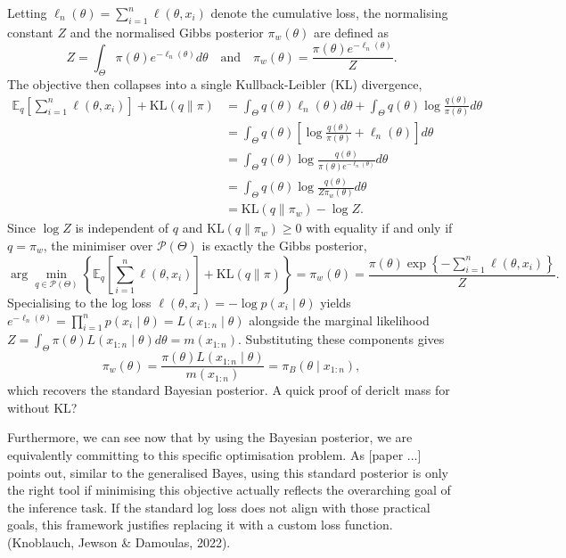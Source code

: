 \documentclass[11pt,a4paper]{article}
\newcommand{\add}[1]{{\color{red}#1}}
\begin{document}
Letting $\ell_n(\theta) = \sum_{i=1}^{n}\ell(\theta,x_i)$ denote the cumulative loss, the normalising constant $Z$ and the normalised Gibbs posterior $\pi_w(\theta)$ are defined as
$$Z = \int_{\Theta} \pi(\theta)e^{-\ell_n(\theta)}d\theta \quad \text{and} \quad \pi_w(\theta) = \frac{\pi(\theta)e^{-\ell_n(\theta)}}{Z}.$$
The objective then collapses into a single Kullback-Leibler (KL) divergence,
$$
    \begin{aligned}
        \mathbb{E}_{q}\left[\sum_{i=1}^{n}\ell(\theta,x_i)\right] + \mathrm{KL}(q \| \pi)
         & = \int_{\Theta} q(\theta)\ell_n(\theta)d\theta + \int_{\Theta} q(\theta)\log\frac{q(\theta)}{\pi(\theta)}d\theta \\
         & = \int_{\Theta} q(\theta)\left[\log\frac{q(\theta)}{\pi(\theta)} + \ell_n(\theta)\right]d\theta                  \\
         & = \int_{\Theta} q(\theta)\log\frac{q(\theta)}{\pi(\theta)e^{-\ell_n(\theta)}}d\theta                             \\ &= \int_{\Theta} q(\theta)\log\frac{q(\theta)}{Z\pi_w(\theta)}d\theta \\ &= \mathrm{KL}(q \| \pi_w) - \log Z.
    \end{aligned}
$$
Since $\log Z$ is independent of $q$ and $\mathrm{KL}(q \| \pi_w) \ge 0$ with equality if and only if $q = \pi_w$, the minimiser over $\mathcal{P}(\Theta)$ is exactly the Gibbs posterior,
$$\arg\min_{q \in \mathcal{P}(\Theta)}\left\{\mathbb{E}_{q}\left[\sum_{i=1}^{n}\ell(\theta,x_i)\right] + \mathrm{KL}(q \| \pi)\right\} = \pi_w(\theta) = \frac{\pi(\theta)\exp\left\{-\sum_{i=1}^{n}\ell(\theta,x_i)\right\}}{Z}.$$
Specialising to the log loss $\ell(\theta,x_i) = -\log p(x_i\mid\theta)$ yields $e^{-\ell_n(\theta)} = \prod_{i=1}^{n} p(x_i\mid\theta) = L(x_{1:n}\mid\theta)$ alongside the marginal likelihood $Z = \int_{\Theta}\pi(\theta)L(x_{1:n}\mid\theta)d\theta = m(x_{1:n})$. Substituting these components gives$$\pi_w(\theta) = \frac{\pi(\theta)L(x_{1:n}\mid\theta)}{m(x_{1:n})} = \pi_B(\theta \mid x_{1:n}),$$which recovers the standard Bayesian posterior. \add{A quick proof of dericlt mass for without $\mathrm{KL}$?}

Furthermore, we can see now that by using the Bayesian posterior, we are equivalently committing to this specific optimisation problem. As [paper ...] points out, similar to the generalised Bayes, using this standard posterior is only the right tool if minimising this objective actually reflects the overarching goal of the inference task. If the standard log loss does not align with those practical goals, this framework justifies replacing it with a custom loss function. (Knoblauch, Jewson \& Damoulas, 2022).
\end{document}
